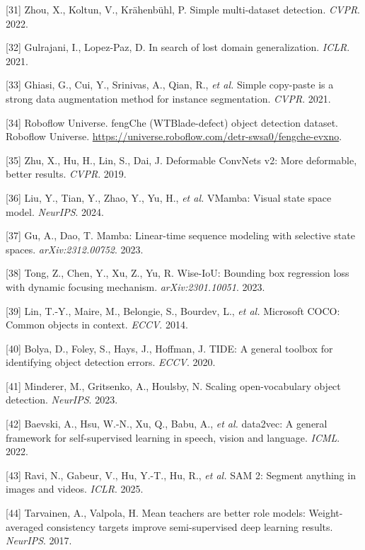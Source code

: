 \documentclass[
  10pt,
]{article}
\newlength{\cslhangindent}
\newenvironment{CSLReferences}[2] %
 {\begin{list}{}{%
  \setlength{\itemindent}{0pt}
  \setlength{\leftmargin}{0pt}
  \setlength{\parsep}{0pt}
  \ifodd #1
   \setlength{\leftmargin}{\cslhangindent}
   \setlength{\itemindent}{-1\cslhangindent}
  \fi
  \setlength{\itemsep}{#2\baselineskip}}}
 {\end{list}}
\begin{document}
\begin{CSLReferences}{0}{0}
{[}31{]} Zhou, X., Koltun, V., Krähenbühl, P. Simple multi-dataset
detection. \emph{CVPR}. 2022.

{[}32{]} Gulrajani, I., Lopez-Paz, D. In search of lost domain
generalization. \emph{ICLR}. 2021.

{[}33{]} Ghiasi, G., Cui, Y., Srinivas, A., Qian, R., \emph{et al.}
Simple copy-paste is a strong data augmentation method for instance
segmentation. \emph{CVPR}. 2021.

{[}34{]} Roboflow Universe. fengChe (WTBlade-defect) object detection
dataset. Roboflow Universe.
\url{https://universe.roboflow.com/detr-swsa0/fengche-evxno}.

{[}35{]} Zhu, X., Hu, H., Lin, S., Dai, J. Deformable {ConvNets} v2:
More deformable, better results. \emph{CVPR}. 2019.

{[}36{]} Liu, Y., Tian, Y., Zhao, Y., Yu, H., \emph{et al.} {VMamba}:
Visual state space model. \emph{NeurIPS}. 2024.

{[}37{]} Gu, A., Dao, T. Mamba: Linear-time sequence modeling with
selective state spaces. \emph{arXiv:2312.00752}. 2023.

{[}38{]} Tong, Z., Chen, Y., Xu, Z., Yu, R. {Wise-IoU}: Bounding box
regression loss with dynamic focusing mechanism.
\emph{arXiv:2301.10051}. 2023.

{[}39{]} Lin, T.-Y., Maire, M., Belongie, S., Bourdev, L., \emph{et al.}
Microsoft {COCO}: Common objects in context. \emph{ECCV}. 2014.

{[}40{]} Bolya, D., Foley, S., Hays, J., Hoffman, J. {TIDE}: A general
toolbox for identifying object detection errors. \emph{ECCV}. 2020.

{[}41{]} Minderer, M., Gritsenko, A., Houlsby, N. Scaling
open-vocabulary object detection. \emph{NeurIPS}. 2023.

{[}42{]} Baevski, A., Hsu, W.-N., Xu, Q., Babu, A., \emph{et al.}
data2vec: A general framework for self-supervised learning in speech,
vision and language. \emph{ICML}. 2022.

{[}43{]} Ravi, N., Gabeur, V., Hu, Y.-T., Hu, R., \emph{et al.} {SAM 2}:
Segment anything in images and videos. \emph{ICLR}. 2025.

{[}44{]} Tarvainen, A., Valpola, H. Mean teachers are better role
models: Weight-averaged consistency targets improve semi-supervised deep
learning results. \emph{NeurIPS}. 2017.

\end{CSLReferences}
\end{document}
